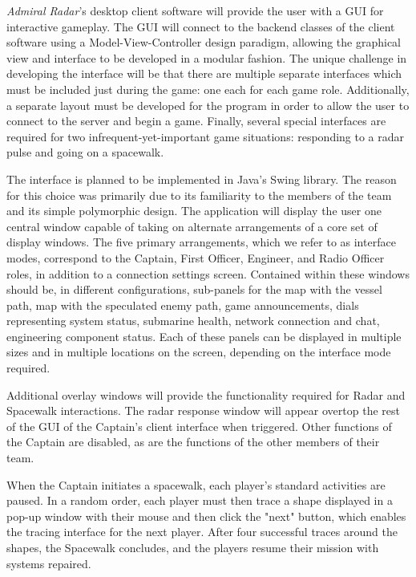 \textit{Admiral Radar}'s desktop client software will provide the user with a GUI for interactive gameplay. The GUI will connect to the backend classes of the client software using a Model-View-Controller design paradigm, allowing the graphical view and interface to be developed in a modular fashion. The unique challenge in developing the interface will be that there are multiple separate interfaces which must be included just during the game: one each for each game role. Additionally, a separate layout must be developed for the program in order to allow the user to connect to the server and begin a game. Finally, several special interfaces are required for two infrequent-yet-important game situations: responding to a radar pulse and going on a spacewalk. 

The interface is planned to be implemented in Java's Swing library. The reason for this choice was primarily due to its familiarity to the members of the team and its simple polymorphic design. The application will display the user one central window capable of taking on alternate arrangements of a core set of display windows. The five primary arrangements, which we refer to as interface modes, correspond to the Captain, First Officer, Engineer, and Radio Officer roles, in addition to a connection settings screen. Contained within these windows should be, in different configurations, sub-panels for the map with the vessel path, map with the speculated enemy path, game announcements, dials representing system status, submarine health, network connection and chat, engineering component status. Each of these panels can be displayed in multiple sizes and in multiple locations on the screen, depending on the interface mode required. 


Additional overlay windows will provide the functionality required for Radar and Spacewalk interactions. The radar response window will appear overtop the rest of the GUI of the Captain's client interface when triggered. Other functions of the Captain are disabled, as are the functions of the other members of their team.


When the Captain initiates a spacewalk, each player's standard activities are paused. In a random order, each player must then trace a shape displayed in a pop-up window with their mouse and then click the "next" button, which enables the tracing interface for the next player. After four successful traces around the shapes, the Spacewalk concludes, and the players resume their mission with systems repaired.

